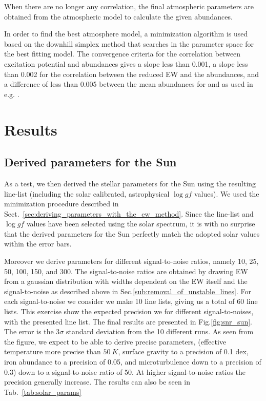 \documentclass{aa}
\begin{document}
When there are no longer any correlation, the final atmospheric
parameters are obtained from the atmospheric model to calculate the
given abundances.

In order to find the best atmosphere model, a minimization algorithm
is used based on the downhill simplex method \citep{Press1992}
that searches in the parameter space for the best fitting model.
The convergence criteria for the correlation between excitation
potential and abundances gives a slope less than 0.001, a slope
less than 0.002 for the correlation between the reduced EW and
the abundances, and a difference of less than 0.005 between the
mean abundances for  and  as used in e.g.
\citet{Tsantaki2013,Sousa2008a}.







\section{Results}
\label{sec:results}


\subsection{Derived parameters for the Sun}
\label{sec:derived_parameters_of_the_sun}

As a test, we then derived the stellar parameters for the Sun using
the resulting line-list (including the solar calibrated, astrophysical
$\log \mathit{gf}$ values). We used the minimization procedure described
in Sect.~\ref{sec:deriving_parameters_with_the_ew_method}. Since the
line-list and $\log\mathit{gf}$ values have been selected using the
solar spectrum, it is with no surprise that the derived parameters for
the Sun perfectly match the adopted solar values within the error bars.

Moreover we derive parameters for different signal-to-noise ratios,
namely 10, 25, 50, 100, 150, and 300. The signal-to-noise ratios
are obtained by drawing EW from a gaussian distribution with widths
dependent on the EW itself and the signal-to-noise as described above
in Sec.\ref{sub:removal_of_unstable_lines}. For each signal-to-noise we
consider we make 10 line lists, giving us a total of 60 line lists. This
exercise show the expected precision we for different signal-to-noises,
with the presented line list. The final results are presented in
Fig.\ref{fig:snr_sun}. The error is the $3 \sigma$ standard deviation
from the 10 different runs. As seen from the figure, we expect to
be able to derive precise parameters, (effective temperature more
precise than $\SI{50}{K}$, surface gravity to a precision of 0.1 dex,
iron abundance to a precision of 0.05, and microturbulence down to a
precision of 0.3) down to a signal-to-noise ratio of 50. At higher
signal-to-noise ratios the precision generally increase. The results can
also be seen in Tab.~\ref{tab:solar_params}
\end{document}
